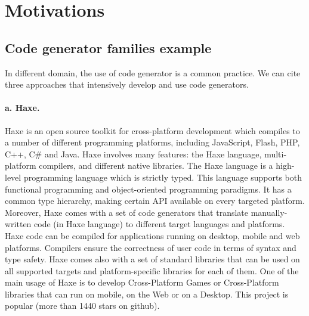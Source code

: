 
\section{Motivations}

\subsection{Code generator families example}

In different domain, the use of code generator is a common practice. We can cite three approaches that intensively develop and use code generators. 

\paragraph{a. Haxe.} 	Haxe is an open source toolkit for cross-platform development which compiles to a number of different programming platforms, including JavaScript, Flash, PHP, C++, C\# and Java. Haxe involves many features: the Haxe language, multi-platform compilers, and different native libraries. The Haxe language is a high-level programming language which is strictly typed. This language supports both functional programming and object-oriented programming paradigms. It has a common type hierarchy, making certain API available on every targeted platform. Moreover, Haxe comes with a set of code generators that translate manually-written code (in Haxe language) to different target languages and platforms.  Haxe code can be compiled for applications running on desktop, mobile and web platforms. Compilers ensure the correctness of user code in terms of syntax and type safety. Haxe comes also with a set of standard libraries that can be used on all supported targets and platform-specific libraries for each of them. One of the main usage of Haxe is to develop Cross-Platform Games or Cross-Platform libraries that can run on mobile, on the Web or on a Desktop.  	This project is popular (more than 1440 stars on github).


